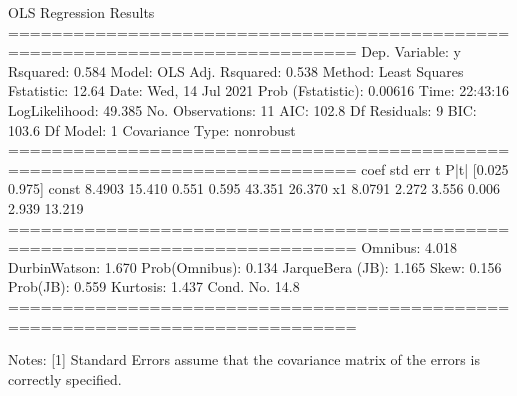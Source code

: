 \documentclass[letterpaper,10pt,english]{jupyterBook}
\begin{document}
\begin{sphinxVerbatim}[commandchars=\\\{\}]
                            OLS Regression Results                            
==============================================================================
Dep. Variable:                      y   R\PYGZhy{}squared:                       0.584
Model:                            OLS   Adj. R\PYGZhy{}squared:                  0.538
Method:                 Least Squares   F\PYGZhy{}statistic:                     12.64
Date:                Wed, 14 Jul 2021   Prob (F\PYGZhy{}statistic):            0.00616
Time:                        22:43:16   Log\PYGZhy{}Likelihood:                \PYGZhy{}49.385
No. Observations:                  11   AIC:                             102.8
Df Residuals:                       9   BIC:                             103.6
Df Model:                           1                                         
Covariance Type:            nonrobust                                         
==============================================================================
                 coef    std err          t      P\PYGZgt{}|t|      [0.025      0.975]
\PYGZhy{}\PYGZhy{}\PYGZhy{}\PYGZhy{}\PYGZhy{}\PYGZhy{}\PYGZhy{}\PYGZhy{}\PYGZhy{}\PYGZhy{}\PYGZhy{}\PYGZhy{}\PYGZhy{}\PYGZhy{}\PYGZhy{}\PYGZhy{}\PYGZhy{}\PYGZhy{}\PYGZhy{}\PYGZhy{}\PYGZhy{}\PYGZhy{}\PYGZhy{}\PYGZhy{}\PYGZhy{}\PYGZhy{}\PYGZhy{}\PYGZhy{}\PYGZhy{}\PYGZhy{}\PYGZhy{}\PYGZhy{}\PYGZhy{}\PYGZhy{}\PYGZhy{}\PYGZhy{}\PYGZhy{}\PYGZhy{}\PYGZhy{}\PYGZhy{}\PYGZhy{}\PYGZhy{}\PYGZhy{}\PYGZhy{}\PYGZhy{}\PYGZhy{}\PYGZhy{}\PYGZhy{}\PYGZhy{}\PYGZhy{}\PYGZhy{}\PYGZhy{}\PYGZhy{}\PYGZhy{}\PYGZhy{}\PYGZhy{}\PYGZhy{}\PYGZhy{}\PYGZhy{}\PYGZhy{}\PYGZhy{}\PYGZhy{}\PYGZhy{}\PYGZhy{}\PYGZhy{}\PYGZhy{}\PYGZhy{}\PYGZhy{}\PYGZhy{}\PYGZhy{}\PYGZhy{}\PYGZhy{}\PYGZhy{}\PYGZhy{}\PYGZhy{}\PYGZhy{}\PYGZhy{}\PYGZhy{}
const         \PYGZhy{}8.4903     15.410     \PYGZhy{}0.551      0.595     \PYGZhy{}43.351      26.370
x1             8.0791      2.272      3.556      0.006       2.939      13.219
==============================================================================
Omnibus:                        4.018   Durbin\PYGZhy{}Watson:                   1.670
Prob(Omnibus):                  0.134   Jarque\PYGZhy{}Bera (JB):                1.165
Skew:                           0.156   Prob(JB):                        0.559
Kurtosis:                       1.437   Cond. No.                         14.8
==============================================================================

Notes:
[1] Standard Errors assume that the covariance matrix of the errors is correctly specified.
\end{sphinxVerbatim}
\end{document}
